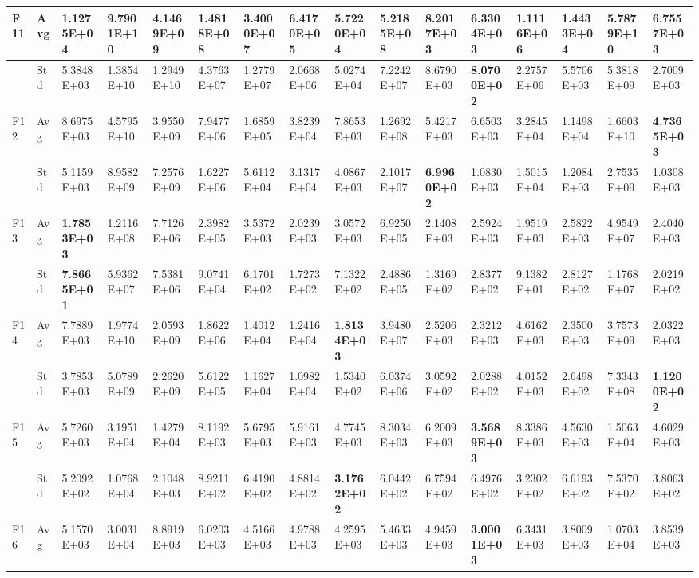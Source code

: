 \documentclass{article} %
\begin{document}
\begin{tabular}{|p{0.3in}|p{0.3in}|p{0.3in}|p{0.3in}|p{0.3in}|p{0.3in}|p{0.3in}|p{0.3in}|p{0.3in}|p{0.3in}|p{0.3in}|p{0.3in}|p{0.3in}|p{0.3in}|p{0.3in}|p{0.5in}|}
F11 & Avg & 1.1275E+04 & 9.7901E+10 & 4.1469E+09 & 1.4818E+08 & 3.4000E+07 & 6.4170E+05 & 5.7220E+04 & 5.2185E+08 & 8.2017E+03 & \textbf{6.3304E+03} & 1.1116E+06 & 1.4433E+04 & 5.7879E+10 & 6.7557E+03 \\ \hline 
 & Std & 5.3848E+03 & 1.3854E+10 & 1.2949E+10 & 4.3763E+07 & 1.2779E+07 & 2.0668E+06 & 5.0274E+04 & 7.2242E+07 & 8.6790E+03 & \textbf{8.0700E+02} & 2.2757E+06 & 5.5706E+03 & 5.3818E+09 & 2.7009E+03 \\ \hline 
F12 & Avg & 8.6975E+03 & 4.5795E+10 & 3.9550E+09 & 7.9477E+06 & 1.6859E+05 & 3.8239E+04 & 7.8653E+03 & 1.2692E+08 & 5.4217E+03 & 6.6503E+03 & 3.2845E+04 & 1.1498E+04 & 1.6603E+10 & \textbf{4.7365E+03} \\ \hline 
 & Std & 5.1159E+03 & 8.9582E+09 & 7.2576E+09 & 1.6227E+06 & 5.6112E+04 & 3.1317E+04 & 4.0867E+03 & 2.1017E+07 & \textbf{6.9960E+02} & 1.0830E+03 & 1.5015E+04 & 1.2084E+03 & 2.7535E+09 & 1.0308E+03 \\ \hline 
F13 & Avg & \textbf{1.7853E+03} & 1.2116E+08 & 7.7126E+06 & 2.3982E+05 & 3.5372E+03 & 2.0239E+03 & 3.0572E+03 & 6.9250E+05 & 2.1408E+03 & 2.5924E+03 & 1.9519E+03 & 2.5822E+03 & 4.9549E+07 & 2.4040E+03 \\ \hline 
 & Std & \textbf{7.8665E+01} & 5.9362E+07 & 7.5381E+06 & 9.0741E+04 & 6.1701E+02 & 1.7273E+02 & 7.1322E+02 & 2.4886E+05 & 1.3169E+02 & 2.8377E+02 & 9.1382E+01 & 2.8127E+02 & 1.1768E+07 & 2.0219E+02 \\ \hline 
F14 & Avg & 7.7889E+03 & 1.9774E+10 & 2.0593E+09 & 1.8622E+06 & 1.4012E+04 & 1.2416E+04 & \textbf{1.8134E+03} & 3.9480E+07 & 2.5206E+03 & 2.3212E+03 & 4.6162E+03 & 2.3500E+03 & 3.7573E+09 & 2.0322E+03 \\ \hline 
 & Std & 3.7853E+03 & 5.0789E+09 & 2.2620E+09 & 5.6122E+05 & 1.1627E+04 & 1.0982E+04 & 1.5340E+02 & 6.0374E+06 & 3.0592E+02 & 2.0288E+02 & 4.0152E+03 & 2.6498E+02 & 7.3343E+08 & \textbf{1.1200E+02} \\ \hline 
F15 & Avg & 5.7260E+03 & 3.1951E+04 & 1.4279E+04 & 8.1192E+03 & 5.6795E+03 & 5.9161E+03 & 4.7745E+03 & 8.3034E+03 & 6.2009E+03 & \textbf{3.5689E+03} & 8.3386E+03 & 4.5630E+03 & 1.5063E+04 & 4.6029E+03 \\ \hline 
 & Std & 5.2092E+02 & 1.0768E+04 & 2.1048E+03 & 8.9211E+02 & 6.4190E+02 & 4.8814E+02 & \textbf{3.1762E+02} & 6.0442E+02 & 6.7594E+02 & 6.4976E+02 & 3.2302E+02 & 6.6193E+02 & 7.5370E+02 & 3.8063E+02 \\ \hline 
F16 & Avg & 5.1570E+03 & 3.0031E+04 & 8.8919E+03 & 6.0203E+03 & 4.5166E+03 & 4.9788E+03 & 4.2595E+03 & 5.4633E+03 & 4.9459E+03 & \textbf{3.0001E+03} & 6.3431E+03 & 3.8009E+03 & 1.0703E+04 & 3.8539E+03 \\ \hline 

\end{tabular}
\end{document}
